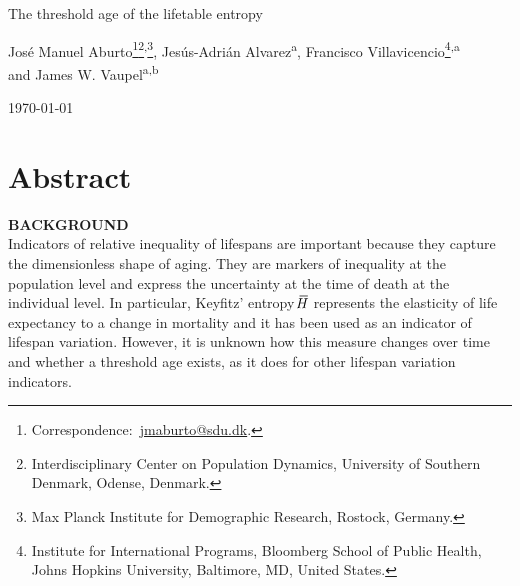 \documentclass[a4paper,twoside, openright, 12pt, leqno]{article}
\newcommand*\xbar[1]{%
   \hbox{%
     \vbox{%
       \hrule height 0.5pt %
       \kern0.3ex%
       \hbox{%
         \kern-0.25em%
         \ensuremath{#1}%
         \kern-0.05em%
       }%
     }%
   }%
}
\newcommand\fnsep{\textsuperscript{,}}
\begin{document}
\renewcommand{\thefootnote}{\alph{footnote}}

\thispagestyle{empty}

\begin{center}
    
    \vspace*{1cm}
    \LARGE{The threshold age of the lifetable entropy}	
    \vspace{.4cm}    
        
           
    \vspace{1cm}
    \large Jos\'e Manuel Aburto\footnote[*]{Correspondence:~\href{mailto:jmaburto@sdu.dk}{jmaburto@sdu.dk}.}\footnote{Interdisciplinary Center on Population Dynamics, University of Southern Denmark, Odense, Denmark.}\fnsep\footnote{Max Planck Institute for Demographic Research, Rostock, Germany.}, Jes\'us-Adri\'an Alvarez\textsuperscript{a}, Francisco Villavicencio\footnote{Institute for International Programs, Bloomberg School of Public Health, Johns Hopkins University, Baltimore, MD, United States.}\fnsep\textsuperscript{a}\\ and James W. Vaupel\textsuperscript{a}\fnsep\textsuperscript{b}
    
    \vspace{1cm}
    \large\today
    \vspace{1cm}
       
\end{center}

\renewcommand{\thefootnote}{\arabic{footnote}}
\setcounter{footnote}{0}

\section*{Abstract}
\bigskip

\textbf{BACKGROUND} \\
Indicators of relative inequality of lifespans are important because they capture the dimensionless shape of aging. They are markers of inequality at the population level and express the uncertainty at the time of death at the individual level. In particular, Keyfitz' entropy $\xbar{H}$ represents the elasticity of life expectancy to a change in mortality and it has been used as an indicator of lifespan variation. However, it is unknown how this measure changes over time and whether a threshold age exists, as it does for other lifespan variation indicators.
\bigskip
\end{document}
